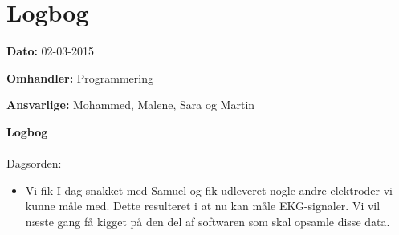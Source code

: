 \chapter{Logbog}

\textbf{Dato:} 02-03-2015

\textbf{Omhandler:} Programmering

\textbf{Ansvarlige:} Mohammed, Malene, Sara og Martin

\textbf{Logbog}
\\
\\
Dagsorden:
\begin{itemize}
	\item 
Vi fik I dag snakket med Samuel og fik udleveret nogle andre elektroder vi kunne måle med. Dette resulteret i at nu kan måle EKG-signaler. Vi vil næste gang få kigget på den del af softwaren som skal opsamle disse data.
\end{itemize}